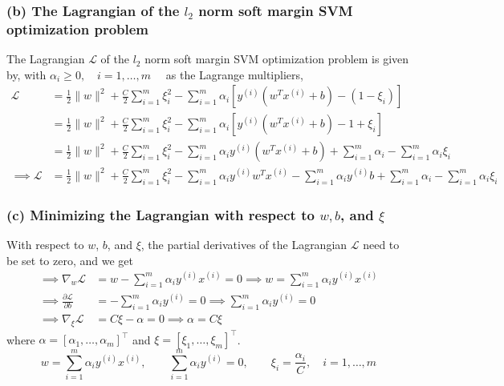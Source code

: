 \subsubsection*{(b) The Lagrangian of the \( l_{2} \) norm soft margin SVM optimization problem}

The Lagrangian \( \mathcal{L} \) of the \( l_{2} \) norm soft margin SVM optimization problem is given by, with \( \alpha_{i} \geq 0, \quad i = 1, \ldots, m \quad \) as the Lagrange multipliers,
\begin{align*}
    \mathcal{L}
     & =
    \frac{1}{2}\|w\|^{2}+\frac{C}{2} \sum_{i=1}^{m} \xi_{i}^{2}
    - \sum_{i=1}^{m} \alpha_{i} \left[ y^{(i)}\left(w^{T} x^{(i)}+b\right) - (1-\xi_{i}) \right]
    \\ & =
    \frac{1}{2}\|w\|^{2}+\frac{C}{2} \sum_{i=1}^{m} \xi_{i}^{2}
    - \sum_{i=1}^{m} \alpha_{i} \left[ y^{(i)}\left(w^{T} x^{(i)}+b\right) - 1 + \xi_{i} \right]
    \\ & =
    \frac{1}{2}\|w\|^{2}+\frac{C}{2} \sum_{i=1}^{m} \xi_{i}^{2}
    - \sum_{i=1}^{m} \alpha_{i} y^{(i)} \left(w^{T} x^{(i)}+b\right)
    + \sum_{i=1}^{m} \alpha_{i} - \sum_{i=1}^{m} \alpha_{i} \xi_{i}
    \\
    \implies
    \mathcal{L}
     & =
    \frac{1}{2} \|w\|^{2}
    + \frac{C}{2} \sum_{i=1}^{m} \xi_{i}^{2}
    - \sum_{i=1}^{m} \alpha_{i} y^{(i)} w^{T} x^{(i)}
    - \sum_{i=1}^{m} \alpha_{i} y^{(i)} b
    + \sum_{i=1}^{m} \alpha_{i}
    - \sum_{i=1}^{m} \alpha_{i} \xi_{i}
\end{align*}

\subsubsection*{(c) Minimizing the Lagrangian with respect to \( w, b \), and \( \xi \)}

With respect to \( w \), \( b \), and \( \xi \), the partial derivatives of the Lagrangian \( \mathcal{L} \) need to be set to zero, and we get
\begin{align*}
    \implies
    \nabla_{w} \mathcal{L}
     & =
    w - \sum_{i=1}^{m} \alpha_{i} y^{(i)} x^{(i)}
    = 0
    \implies w = \sum_{i=1}^{m} \alpha_{i} y^{(i)} x^{(i)}
    \\
    \implies
    \frac{\partial \mathcal{L}}{\partial b}
     & =
    - \sum_{i=1}^{m} \alpha_{i} y^{(i)}
    = 0
    \implies \sum_{i=1}^{m} \alpha_{i} y^{(i)} = 0
    \\
    \implies
    \nabla_{\xi} \mathcal{L}
     & =
    C \xi - \alpha
    = 0
    \implies \alpha = C \xi
\end{align*}
where \( \alpha = {\left[ \alpha_{1}, \ldots, \alpha_{m} \right]}^\top \) and \( \xi = {\left[ \xi_{1}, \ldots, \xi_{m} \right]}^\top \).
\begin{equation*}
    \boxed{
        w
        =
        \sum_{i=1}^{m} \alpha_{i} y^{(i)} x^{(i)}
        ,\qquad
        \sum_{i=1}^{m} \alpha_{i} y^{(i)}
        =
        0
        ,\qquad
        \xi_{i}
        =
        \frac{\alpha_{i}}{C}
        ,\quad
        i = 1, \ldots, m
    }
\end{equation*}

